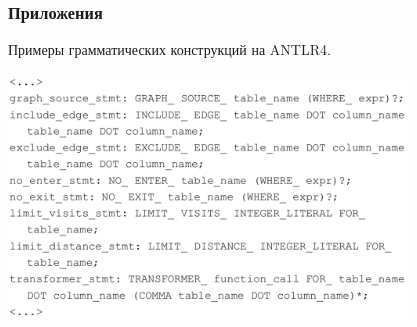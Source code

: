 \documentclass[pdf, hyperref={unicode}, aspectratio=169]{beamer}
\begin{document}
\begin{frame}
\frametitle{Приложения}
	Примеры грамматических конструкций на ANTLR4.

	\begin{center}
		\includegraphics[height = 6.5cm]{img/grammar}
	\end{center}
\end{frame}
\end{document}
